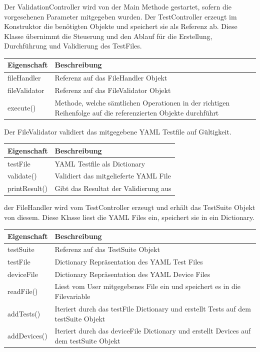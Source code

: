\documentclass[a4,12pt]{scrartcl}
\begin{document}
Der ValidationController wird von der Main Methode gestartet, sofern die vorgesehenen Parameter mitgegeben wurden. Der TestController erzeugt im Konstruktor die benötigten Objekte und speichert sie als Referenz ab. Diese Klasse übernimmt die Steuerung und den Ablauf für die Erstellung, Durchführung und Validierung des TestFiles.
\noindent \begin{table}[H]
\centering
    \begin{tabular}{@{}l p{12cm} @{}}\toprule    
    {Eigenschaft} & {Beschreibung}\\ \midrule      
    fileHandler & Referenz auf das FileHandler Objekt \\
    fileValidator & Referenz auf das FileValidator Objekt\\
    execute() & Methode, welche sämtlichen Operationen in der richtigen Reihenfolge auf die referenzierten Objekte durchführt\\
    \bottomrule
    \end{tabular}
\end{table}
\newpage
{}
Der FileValidator validiert das mitgegebene YAML Testfile auf Gültigkeit.
\noindent \begin{table}[H]
\centering
    \begin{tabular}{@{}l p{12cm} @{}}\toprule    
    {Eigenschaft} & {Beschreibung}\\ \midrule      
    testFile & YAML Testfile als Dictionary \\
    validate() & Validiert das mitgelieferte YAML File\\
    printResult() & Gibt das Resultat der Validierung aus\\
    \bottomrule
    \end{tabular}
\end{table}

der FileHandler wird vom TestController erzeugt und erhält das TestSuite Objekt von diesem. Diese Klasse liest die YAML Files ein, speichert sie in ein Dictionary.
\noindent \begin{table}[H]
\centering
    \begin{tabular}{@{}l p{12cm} @{}}\toprule    
    {Eigenschaft} & {Beschreibung}\\ \midrule
    testSuite & Referenz auf das TestSuite Objekt  \\
    testFile & Dictionary Repräsentation des YAML Test Files\\
    deviceFile & Dictionary Repräsentation des YAML Device Files\\    
    readFile() & Liest vom User mitgegebenes File ein und speichert es in die Filevariable \\
    addTests() & Iteriert durch das testFile Dictionary und erstellt Tests auf dem testSuite Objekt \\
    addDevices() & Iteriert durch das deviceFile Dictionary und erstellt Devices auf dem testSuite Objekt\\
    \bottomrule
    \end{tabular}
\end{table}
\end{document}
